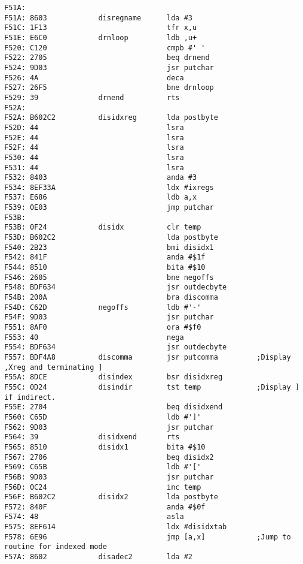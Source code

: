 {\begin{verbatim}
F51A:                 
F51A: 8603            disregname      lda #3
F51C: 1F13                            tfr x,u
F51E: E6C0            drnloop         ldb ,u+
F520: C120                            cmpb #' '
F522: 2705                            beq drnend
F524: 9D03                            jsr putchar
F526: 4A                              deca
F527: 26F5                            bne drnloop
F529: 39              drnend          rts
F52A:                 
F52A: B602C2          disidxreg       lda postbyte
F52D: 44                              lsra
F52E: 44                              lsra
F52F: 44                              lsra
F530: 44                              lsra
F531: 44                              lsra
F532: 8403                            anda #3
F534: 8EF33A                          ldx #ixregs
F537: E686                            ldb a,x
F539: 0E03                            jmp putchar
F53B:                 
F53B: 0F24            disidx          clr temp
F53D: B602C2                          lda postbyte
F540: 2B23                            bmi disidx1
F542: 841F                            anda #$1f
F544: 8510                            bita #$10
F546: 2605                            bne negoffs
F548: BDF634                          jsr outdecbyte
F54B: 200A                            bra discomma
F54D: C62D            negoffs         ldb #'-'
F54F: 9D03                            jsr putchar
F551: 8AF0                            ora #$f0
F553: 40                              nega
F554: BDF634                          jsr outdecbyte
F557: BDF4A8          discomma        jsr putcomma         ;Display ,Xreg and terminating ]
F55A: 8DCE            disindex        bsr disidxreg
F55C: 0D24            disindir        tst temp             ;Display ] if indirect.
F55E: 2704                            beq disidxend      
F560: C65D                            ldb #']'       
F562: 9D03                            jsr putchar
F564: 39              disidxend       rts
F565: 8510            disidx1         bita #$10                       
F567: 2706                            beq disidx2
F569: C65B                            ldb #'['
F56B: 9D03                            jsr putchar
F56D: 0C24                            inc temp
F56F: B602C2          disidx2         lda postbyte
F572: 840F                            anda #$0f
F574: 48                              asla
F575: 8EF614                          ldx #disidxtab
F578: 6E96                            jmp [a,x]            ;Jump to routine for indexed mode
F57A: 8602            disadec2        lda #2

\end{verbatim}}
